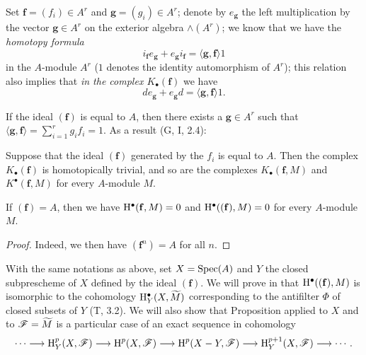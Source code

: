 \begin{env}[1.1.7]
\label{3.1.1.7}
Set $\mathbf{f}=(f_i)\in A^r$ and $\mathbf{g}=(g_i)\in A^r$; denote by $e_\mathbf{g}$ the left multiplication by the vector $\mathbf{g}\in A^r$ on the exterior algebra $\wedge(A^r)$; we know that we have the \emph{homotopy formula}
\[
  i_\mathbf{f}e_\mathbf{g}+e_\mathbf{g}i_\mathbf{f}=\langle\mathbf{g},\mathbf{f}\rangle 1
  \tag{1.1.7.1}
\]
in the $A$-module $A^r$ ($1$ denotes the identity automorphism of $A^r$); this relation also implies that \emph{in the complex $K_\bullet(\mathbf{f})$} we have
\[
  de_\mathbf{g}+e_\mathbf{g}d=\langle\mathbf{g},\mathbf{f}\rangle 1.
  \tag{1.1.7.2}
\]

If the ideal $(\mathbf{f})$ is equal to $A$, then there exists a $\mathbf{g}\in A^r$ such that $\langle\mathbf{g},\mathbf{f}\rangle=\sum_{i=1}^r g_i f_i=1$.
As a result (G, I, 2.4):
\end{env}

\begin{prop}[1.1.8]
\label{3.1.1.8}
Suppose that the ideal $(\mathbf{f})$ generated by the $f_i$ is equal to $A$.
Then the complex $K_\bullet(\mathbf{f})$ is homotopically trivial, and so are the complexes $K_\bullet(\mathbf{f},M)$ and $K^\bullet(\mathbf{f},M)$ for every $A$-module $M$.
\end{prop}

\begin{cor}[1.1.9]
\label{3.1.1.9}
If $(\mathbf{f})=A$, then we have $\mathrm{H}^\bullet(\mathbf{f},M)=0$ and $\mathrm{H}^\bullet((\mathbf{f}),M)=0$ for every $A$-module $M$.
\end{cor}

\begin{proof}
\label{proof-3.1.1.9}
Indeed, we then have $(\mathbf{f}^n)=A$ for all $n$.
\end{proof}

\begin{rmk}[1.1.10]
\label{3.1.1.10}
With the same notations as above, set $X={\mathop{\mathrm{Spec}}\nolimits}(A)$ and $Y$ the closed subprescheme of $X$ defined by the ideal $(\mathbf{f})$.
We will prove in  that $\mathrm{H}^\bullet((\mathbf{f}),M)$ is isomorphic to the cohomology $\mathrm{H}_Y^\bullet(X,{\widetilde{M}})$ corresponding to the antifilter $\Phi$ of closed subsets of $Y$ (T, 3.2).
We will also show that Proposition  applied to $X$ and to $\mathscr{F}={\widetilde{M}}$ is a particular case of an exact sequence in cohomology
\[
  \cdots\to\HH_Y^p(X,\sh{F})\to\HH^p(X,\sh{F})\to\HH^p(X\setmin Y,\sh{F})\to\HH_Y^{p+1}(X,\sh{F})\to\cdots.
\]
\end{rmk}

